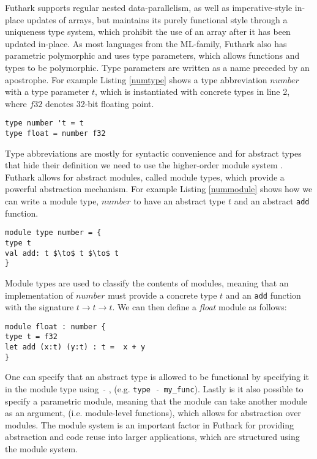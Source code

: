 Futhark supports regular nested data-parallelism, as well as imperative-style
in-place updates of arrays, but maintains its purely functional style through a
uniqueness type system, which prohibit the use of an array after it has been
updated in-place. 
As most languages from the ML-family, Futhark also has parametric polymorphic
and uses type parameters, which allows functions and types  to be polymorphic. 
Type parameters are written as a name preceded by an apostrophe. 
For example Listing \ref{numtype} shows a type abbreviation $number$ with a type
parameter $t$, which is instantiated with concrete types in line 2, where $f32$
denotes 32-bit floating point.
\begin{lstlisting}[label = {numtype}, caption = {Example of type abbreviation
with type parameter in Futhark}]
type number 't = t
type float = number f32
\end{lstlisting}
Type abbreviations are mostly for syntactic convenience and for abstract types
that hide their definition we need to use the higher-order module system
\cite{ICFP18}. 
Futhark allows for abstract modules, called module types, which provide a
powerful abstraction mechanism. 
For example Listing \ref{nummodule} shows how we can write a module type,
$number$ to have an abstract type $t$ and an abstract \texttt{add} function. 
\begin{lstlisting}[label = {nummodule}, caption = {Example of a module type,
$number$, in Futhark}]
module type number = {
type t 
val add: t $\to$ t $\to$ t 
}
\end{lstlisting} 
Module types are used to classify the contents of modules, meaning that an
implementation of $number$ must provide a concrete type $t$ and an \texttt{add}
function with the signature $t \to  t \to t$. 
We can then define a \emph{float} module as follows:
\begin{lstlisting}
module float : number {
type t = f32
let add (x:t) (y:t) : t =  x + y
}
\end{lstlisting}
One can specify that an abstract type is allowed to be functional by specifying
it in the module type using \  $\widehat{ }$ , (e.g. \texttt{type \ $\widehat{
	}$ my\_func}). 
Lastly is it also possible to specify a parametric module, meaning that the
module can take another module as an argument, (i.e. module-level functions),
which allows for abstraction over modules. 
The module system is an important factor in Futhark for providing abstraction
and code reuse into larger applications, which are structured using the module
system.\newline \newline 
